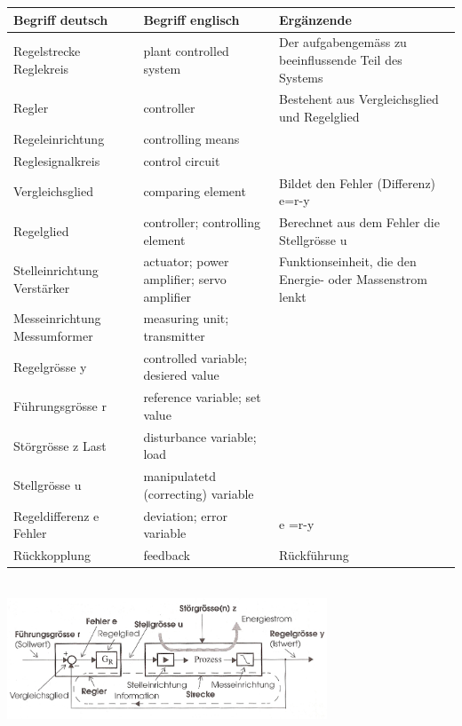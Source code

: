 	\begin{tabular}{|p{2.7cm}|p{5.4cm}|l|}
    	\hline
    	{\bf Begriff deutsch}		&{\bf Begriff englisch}	&{\bf Ergänzende}\\
		\hline
		Regelstrecke
    	Reglekreis			&plant controlled system	&Der aufgabengemäss zu beeinflussende
    	Teil des Systems\\
    	\hline
    	Regler				&controller			&Bestehent aus Vergleichsglied und Regelglied\\
    	\hline
    	Regeleinrichtung	&controlling means&\\
    	\hline
    	Reglesignalkreis	&control circuit&\\
    	\hline
    	Vergleichsglied		&comparing element	&Bildet den Fehler (Differenz)
    											e=r-y\\
    	\hline
    	Regelglied			&controller;
    						controlling element	&Berechnet aus dem Fehler die Stellgrösse u\\
    	\hline
    	Stelleinrichtung
    	Verstärker			&actuator;
					    	power amplifier;
    						servo amplifier		&Funktionseinheit, die den Energie- oder Massenstrom
    											lenkt\\
    	\hline
    	Messeinrichtung
    	Messumformer		&measuring unit;
    						transmitter&\\
    	\hline
    	Regelgrösse y		&controlled variable;
    						desiered value&\\
    	\hline
    	Führungsgrösse r	&reference variable;
    						set value&\\
    	\hline
    	Störgrösse z Last	&disturbance variable;
    						load&\\
    	\hline
    	Stellgrösse u		&manipulatetd (correcting)
    						variable&\\
    	\hline
    	Regeldifferenz e
    	Fehler				&deviation;
    						error variable		&e =r-y\\
    	\hline
    	Rückkopplung		&feedback			&Rückführung\\
    	\hline

	\end{tabular}\\
\includegraphics[height=3.6cm]{./bilder/Grundregelkreis_klein.jpg}


